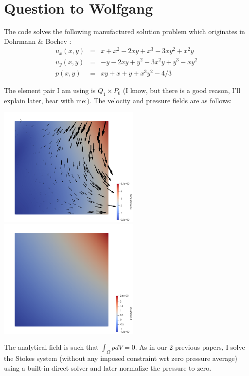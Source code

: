 
\newpage
\section{Question to Wolfgang}

The code solves the following manufactured solution problem
which originates in Dohrmann \& Bochev \cite{dobo04}: 
\begin{eqnarray}
u_x(x,y) &=& x+x^2 - 2xy+x^3 - 3xy^2 + x^2y \\
u_y(x,y) &=& -y-2xy+y^2 -3x^2y + y^3 - xy^2 \\
p(x,y) &=& xy+x+y+x^3y^2 - 4/3
\end{eqnarray}

The element pair I am using is $Q_1\times P_0$ (I know, but there is a good reason, I'll 
explain later, bear with me:).
The velocity and pressure fields are as follows:

\begin{center}
\includegraphics[width=7cm]{../results/exp09/vel.png}
\includegraphics[width=7cm]{../results/exp09/press.png}
\end{center}

The analytical field is such that $\int_\Omega p dV= 0$.
As in our 2 previous papers, I solve the Stokes system (without 
any imposed constraint wrt zero pressure average) using a built-in direct solver
and later normalize the pressure to zero.

